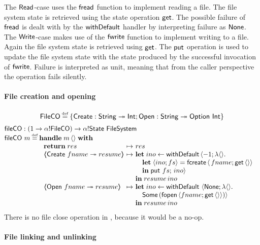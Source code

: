 \documentclass[12pt,phd,lfcs,twoside,openright,logo,leftchapter,normalheadings]{infthesis}
\theoremstyle{plain}
\theoremstyle{definition}
\begin{document}
%
The $\mathsf{Read}$-case uses the $\mathsf{fread}$ function to implement reading a
file. The file system state is retrieved using the state operation
$\mathsf{get}$. The possible failure of $\mathsf{fread}$ is dealt with by the
$\mathsf{withDefault}$ handler by interpreting failure as $\mathsf{None}$.
%
The $\mathsf{Write}$-case makes use of the $\mathsf{fwrite}$ function to implement
writing to a file. Again the file system state is retrieved using
$\mathsf{get}$. The $\mathsf{put}$ operation is used to update the file system state
with the state produced by the successful invocation of
$\mathsf{fwrite}$. Failure is interpreted as unit, meaning that from the
caller perspective the operation fails silently.

\paragraph{File creation and opening}
%
\[
  \dec{FileCO} \defas \{\UCreate : \String \opto \Int; \UOpen : \String \opto \Option~\Int\}
\]
%
\[
  \bl
    \fileAlloc : (\UnitType \to \alpha \eff \dec{FileCO}) \to \alpha \eff \State~\FileSystem\\
    \fileAlloc~m \defas
        \ba[t]{@{}l}
           \Handle\;m\,\Unit\;\With\\
             ~\ba{@{~}l@{~}c@{~}l}
                 \Return\;res      &\mapsto& res\\
                 \OpCase{\UCreate}{fname}{resume} &\mapsto&
                   \bl
                     \Let\;ino \revto \faild\,\Record{-1; \lambda\Unit.\\
                       \quad\bl
                         \Let\;\Record{ino;fs} = \fcreate\,\Record{\,fname;\Uget\,\Unit}\\
                         \In\;\Uput~fs;\,ino}
                       \el\\
                     \In\; resume\,ino
                   \el\\
                 \OpCase{\UOpen}{fname}{resume} &\mapsto&
                   \ba[t]{@{}l}
                      \Let\; ino \revto \faild~\Record{\None; \lambda \Unit.\\
                        \quad\Some\,(\fopen\,\Record{fname;\Uget\,\Unit})}\\
                      \In\;resume\,ino
                   \ea
               \ea
         \ea
  \el
\]
%
There is no file close operation in \fsname{}, because it would be a no-op.

\paragraph{File linking and unlinking}
 \medskip\\
\end{document}
